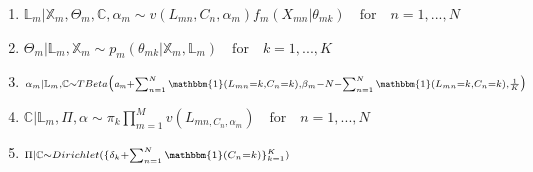 \begin{enumerate}
	\item $\scriptstyle \mathbb{L}_{m} | \mathbb{X}_{m}, \Theta_{m}, \mathbb{C}, \alpha_{m} \sim v(L_{mn}, C_{n}, \alpha_{m}) f_{m}(X_{mn}|\theta_{mk}) \quad \text{for} \quad n=1,...,N $
	\item $\scriptstyle \Theta_{m}|\mathbb{L}_{m}, \mathbb{X}_{m} \sim p_{m}(\theta_{mk}|\mathbb{X}_{m}, \mathbb{L}_{m}) \quad \text{for} \quad k=1,...,K $
	\item $\scriptstyle \alpha_{m}|\mathbb{L}_{m}, \mathbb{C} \sim TBeta \big(\mathit{a_{m}}+\sum_{n=1}^{N}\mathbbm{1}(L_{mn}=k,C_{n}=k), \beta_{m}-N-\sum_{n=1}^{N}\mathbbm{1}(L_{mn}=k,C_{n}=k), \frac{1}{K}\big)$
	\item $\scriptstyle \mathbb{C}|\mathbb{L}_{m}, \Pi, \alpha \sim \pi_{k}\prod_{m=1}^{M}v(L_{mn, C_{n}, \alpha_{m}}) \quad \text{for} \quad n=1,...,N$
	\item $\scriptstyle \Pi|\mathbb{C} \sim Dirichlet(\{ \delta_{k} + \sum_{n=1}^{N}\mathbbm{1}(C_{n}=k)\}_{k=1}^{K })$
\end{enumerate}